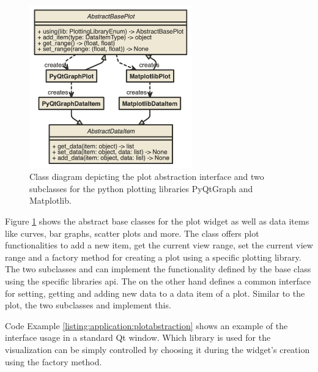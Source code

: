 \begin{figure}[h]
    \centering
    \includegraphics[width=7cm]{resources/img/class/plotabstraction}
    \caption{
        Class diagram depicting the plot abstraction interface and two
        subclasses for the python plotting libraries PyQtGraph and Matplotlib. 
    }
    \label{fig:application:design:classdiagram:plot}
\end{figure}

Figure \ref{fig:application:design:classdiagram:plot} shows the abstract
base classes for the plot widget as well as data items like curves, bar graphs,
scatter plots and more. The class  offers
plot functionalities to add a new item, get the current view range, set the
current view range and a factory method for creating a plot using a specific
plotting library. The two subclasses  and
 can implement the functionality defined by
the base class using the specific libraries \gls{api}. The
 on the other hand defines a common
interface for setting, getting and adding new data to a data item of a plot.
Similar to the plot, the two subclasses 
and  implement this.

Code Example \ref{listing:application:plotabstraction} shows an example of the
interface usage in a standard Qt window. Which library is used for the
visualization can be simply controlled by choosing it during the widget's
creation using the  factory method.




